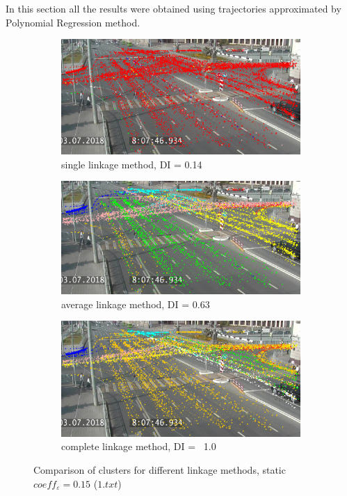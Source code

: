 In this section all the results were obtained using trajectories approximated by Polynomial Regression method.

\begin{figure}[!htb]
	\centering
	\begin{subfigure}[!htb]{0.3\textwidth}
		\centering{}
		\includegraphics[width=\textwidth]{images/link_meth_comp_stat_min.png}
		\caption{single linkage method, DI = 0.14}
		\label{fig:link-meth-comp-stat-min}
	\end{subfigure}
	\hfill
	\begin{subfigure}[!htb]{0.3\textwidth}
		\centering{}
		\includegraphics[width=\textwidth]{images/link_meth_comp_stat_avg.png}
		\caption{average linkage method, DI = 0.63}
		\label{fig:link-meth-comp-stat-avg}
	\end{subfigure}
	\hfill
	\begin{subfigure}[!htb]{0.3\textwidth}
		\centering{}
		\includegraphics[width=\textwidth]{images/link_meth_comp_stat_max.png}
		\caption{complete linkage method, DI = ~1.0}
		\label{fig:link-meth-comp-stat-max}
	\end{subfigure}
	\caption{Comparison of clusters for different linkage methods, static $coeff_\varepsilon = 0.15$ ($1.txt$)}
	\label{fig:link-meth-comp-stat}
\end{figure}

